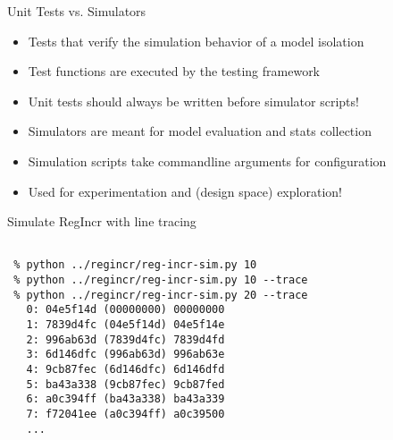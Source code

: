 \begin{frame}{Unit Tests vs. Simulators}

 
\begin{itemize}
  \item Tests that verify the simulation behavior of a model isolation
  \item Test functions are executed by the  testing framework
  \item Unit tests should always be written before simulator scripts!
\end{itemize}

\vspace{0.2in}

 
\begin{itemize}
  \item Simulators are meant for model evaluation and stats collection
  \item Simulation scripts take commandline arguments for configuration
  \item Used for experimentation and (design space) exploration!
\end{itemize}

\end{frame}

\begin{task}\begin{frame}[fragile]{Simulate RegIncr with line tracing}

\vspace{-0.15in}
\begin{Verbatim}[commandchars=\\\{\}]
 % cd \midtilde/pymtl-tut/build

 % python ../regincr/reg-incr-sim.py 10
 % python ../regincr/reg-incr-sim.py 10 --trace
 % python ../regincr/reg-incr-sim.py 20 --trace
   0: 04e5f14d (00000000) 00000000
   1: 7839d4fc (04e5f14d) 04e5f14e
   2: 996ab63d (7839d4fc) 7839d4fd
   3: 6d146dfc (996ab63d) 996ab63e
   4: 9cb87fec (6d146dfc) 6d146dfd
   5: ba43a338 (9cb87fec) 9cb87fed
   6: a0c394ff (ba43a338) ba43a339
   7: f72041ee (a0c394ff) a0c39500
   ...
\end{Verbatim}

\end{frame}
\end{task}

